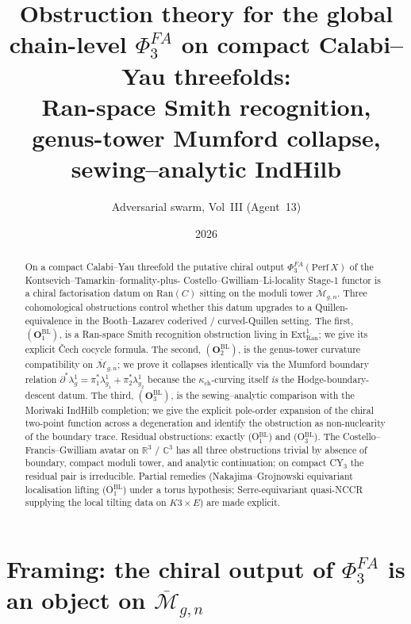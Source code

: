 \documentclass[11pt]{amsart}
\newcommand{\kch}{\kappa_{\mathrm{ch}}}
\newcommand{\Ran}{\mathrm{Ran}}
\newcommand{\Mbar}{\overline{\mathcal{M}}}
\newcommand{\Perf}{\mathrm{Perf}}
\newcommand{\bC}{\mathbb{C}}
\newcommand{\bR}{\mathbb{R}}
\begin{document}
\title{Obstruction theory for the global chain-level $\Phi^{FA}_3$ on
compact Calabi--Yau threefolds:\\
Ran-space Smith recognition, genus-tower Mumford collapse,
sewing--analytic IndHilb}
\author{Adversarial swarm, Vol~III (Agent~13)}
\date{2026}
\maketitle

\begin{abstract}
On a compact Calabi--Yau threefold the putative chiral output
$\Phi^{FA}_3(\Perf\,X)$ of the Kontsevich--Tamarkin--formality-plus-
Costello--Gwilliam--Li-locality Stage-1 functor is a chiral
factorisation datum on $\Ran(C)$ sitting on the moduli tower
$\Mbar_{g,n}$. Three cohomological obstructions control whether this
datum upgrades to a Quillen-equivalence in the Booth--Lazarev
coderived / curved-Quillen setting. The first, $(\mathbf{O}_1^{\mathrm{BL}})$,
is a Ran-space Smith recognition obstruction living in
$\mathrm{Ext}^1_{\Ran}$; we give its explicit \v{C}ech cocycle
formula. The second, $(\mathbf{O}_2^{\mathrm{BL}})$, is the
genus-tower curvature compatibility on $\Mbar_{g,n}$; we prove it
collapses identically via the Mumford boundary relation
$\partial^*\lambda_g^1 = \pi_1^*\lambda_{g_1}^1 + \pi_2^*\lambda_{g_2}^1$
because the $\kch$-curving itself \emph{is} the Hodge-boundary-descent
datum. The third, $(\mathbf{O}_3^{\mathrm{BL}})$, is the
sewing--analytic comparison with the Moriwaki IndHilb completion;
we give the explicit pole-order expansion of the chiral two-point
function across a degeneration and identify the obstruction as
non-nuclearity of the boundary trace. Residual obstructions: exactly
(O$_1^{\mathrm{BL}}$) and (O$_3^{\mathrm{BL}}$). The Costello--Francis--Gwilliam
avatar on $\bR^3$ / $\bC^3$ has all three obstructions trivial by
absence of boundary, compact moduli tower, and analytic continuation;
on compact CY$_3$ the residual pair is irreducible. Partial remedies
(Nakajima--Grojnowski equivariant localisation lifting (O$_1^{\mathrm{BL}}$)
under a torus hypothesis; Serre-equivariant quasi-NCCR supplying the
local tilting data on $K3\times E$) are made explicit.
\end{abstract}

\tableofcontents

\section{Framing: the chiral output of $\Phi^{FA}_3$ is an object on
$\Mbar_{g,n}$}
\label{sec:framing}
\end{document}
